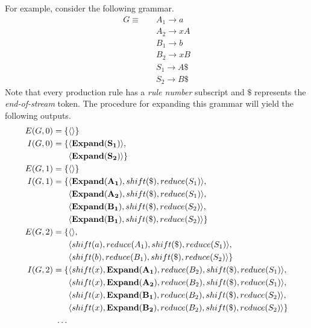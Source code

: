 \documentclass[A4]{sig-alternate}
\begin{document}
For example, consider the following grammar.
{\small\begin{align*}
G \equiv \quad & A_1 \rightarrow a\\
               & A_2 \rightarrow x A\\
               & B_1 \rightarrow b\\
               & B_2 \rightarrow x B\\
               & S_1 \rightarrow A \$\\
               & S_2 \rightarrow B \$
\end{align*}}
Note that every production rule has a \emph{rule number} subscript and $\$$ represents the \emph{end-of-stream} token.
The procedure for expanding this grammar will yield the following outputs. 
{\small\begin{align*}
E(G, 0) = \{ & \langle \rangle \}\\
I(G, 0) = \{ & \langle \mathbf{Expand(S_1)} \rangle,\\
             & \langle \mathbf{Expand(S_2)} \rangle \}\\
E(G, 1) = \{ & \langle \rangle \}\\
I(G, 1) = \{ & \langle \mathbf{Expand(A_1)}, shift(\$), reduce(S_1) \rangle,\\
             & \langle \mathbf{Expand(A_2)}, shift(\$), reduce(S_1) \rangle,\\
             & \langle \mathbf{Expand(B_1)}, shift(\$), reduce(S_2) \rangle, \\
             & \langle \mathbf{Expand(B_1)}, shift(\$), reduce(S_2) \rangle \}\\
E(G, 2) = \{ & \langle \rangle, \\
             & \langle shift(a), reduce(A_1), shift(\$), reduce(S_1) \rangle,\\
             & \langle shift(b), reduce(B_1), shift(\$), reduce(S_2) \rangle \}\\
I(G, 2) = \{ & \langle shift(x), \mathbf{Expand(A_1)}, reduce(B_2), shift(\$), reduce(S_1) \rangle,\\
             & \langle shift(x), \mathbf{Expand(A_2)}, reduce(B_2), shift(\$), reduce(S_1) \rangle,\\
             & \langle shift(x), \mathbf{Expand(B_1)}, reduce(B_2), shift(\$), reduce(S_2) \rangle,\\
             & \langle shift(x), \mathbf{Expand(B_2)}, reduce(B_2), shift(\$), reduce(S_2) \rangle \}\\
\textellipsis
\end{align*}}
\end{document}
